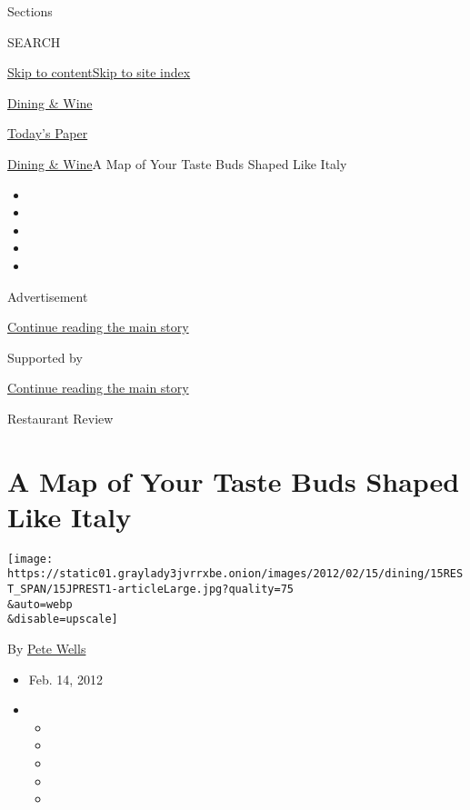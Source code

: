 Sections

SEARCH

\protect\hyperlink{site-content}{Skip to
content}\protect\hyperlink{site-index}{Skip to site index}

\href{https://www.nytimes3xbfgragh.onion/pages/dining/index.html}{Dining
\& Wine}

\href{https://myaccount.nytimes3xbfgragh.onion/auth/login?response_type=cookie\&client_id=vi}{}

\href{https://www.nytimes3xbfgragh.onion/section/todayspaper}{Today's
Paper}

\href{/pages/dining/index.html}{Dining \& Wine}\textbar{}A Map of Your
Taste Buds Shaped Like Italy

\begin{itemize}
\item
\item
\item
\item
\item
\end{itemize}

Advertisement

\protect\hyperlink{after-top}{Continue reading the main story}

Supported by

\protect\hyperlink{after-sponsor}{Continue reading the main story}

Restaurant Review

\hypertarget{a-map-of-your-taste-buds-shaped-like-italy}{%
\section{A Map of Your Taste Buds Shaped Like
Italy}\label{a-map-of-your-taste-buds-shaped-like-italy}}

\texttt{[image: https://static01.graylady3jvrrxbe.onion/images/2012/02/15/dining/15REST\_SPAN/15JPREST1-articleLarge.jpg?quality=75\\\&auto=webp\\\&disable=upscale]}

By \href{https://www.nytimes3xbfgragh.onion/by/pete-wells}{Pete Wells}

\begin{itemize}
\item
  Feb. 14, 2012
\item
  \begin{itemize}
  \item
  \item
  \item
  \item
  \item
  \end{itemize}
\end{itemize}

